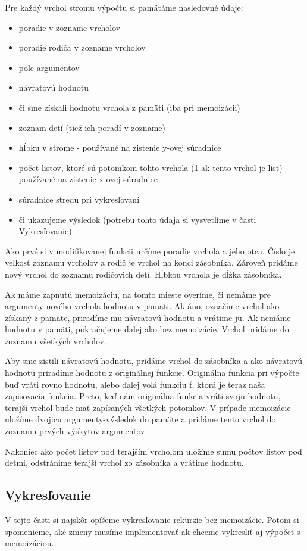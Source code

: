 Pre každý vrchol stromu výpočtu si pamätáme nasledovné údaje:

\begin{itemize}
  \item poradie v zozname vrcholov
  \item poradie rodiča v zozname vrcholov
  \item pole argumentov
  \item návratovú hodnotu
  \item či sme získali hodnotu vrchola z pamäti (iba pri memoizácii)
  \item zoznam detí (tiež ich poradí v zozname)
  \item hĺbku v strome - používané na zistenie y-ovej súradnice
  \item počet listov, ktoré sú potomkom tohto vrchola (1 ak tento vrchol je list) - používané na zistenie
    x-ovej súradnice
  \item súradnice stredu pri vykresľovaní
  \item či ukazujeme výsledok (potrebu tohto údaja si vysvetlíme v časti Vykresľovanie)
\end{itemize}

Ako prvé si v modifikovanej funkcii určíme poradie vrchola a jeho otca. Číslo
je veľkosť zoznamu vrcholov a rodič je vrchol na konci zásobníka. Zároveň pridáme
nový vrchol do zoznamu rodičovich detí. Hĺbkou vrchola je dĺžka zásobníka.

Ak máme zapnutú memoizáciu, na tomto mieste overíme, či nemáme pre argumenty nového
vrchola hodnotu v pamäti. Ak áno, označíme vrchol ako získaný z pamäte, priradíme mu
návratovú hodnotu a vrátime ju. Ak nemáme hodnotu v pamäti, pokračujeme ďalej ako
bez memoizácie. Vrchol pridáme do zoznamu všetkých vrcholov.

Aby sme zistili návratovú hodnotu, pridáme vrchol do zásobníka a ako návratovú
hodnotu priradíme hodnotu z originálnej funkcie. Originálna funkcia pri výpočte
buď vráti rovno hodnotu, alebo ďalej volá funkciu f, ktorá je teraz naša zapisovacia
funkcia. Preto, keď nám originálna funkcia vráti svoju hodnotu, terajší vrchol bude mať
zapísaných všetkých potomkov. V prípade memoizácie uložíme dvojicu argumenty-výsledok do
pamäte a pridáme tento vrchol do zoznamu prvých výskytov argumentov.

Nakoniec ako počet listov pod terajším vrcholom uložíme sumu počtov listov pod deťmi,
odstránime terajší vrchol zo zásobníka a vrátime hodnotu.

\subsection{Vykresľovanie}
V tejto časti si najskôr opíšeme vykresľovanie rekurzie bez memoizácie. Potom
si spomenieme, aké zmeny musíme implementovať ak chceme vykresliť aj výpočet s
memoizáciou.


